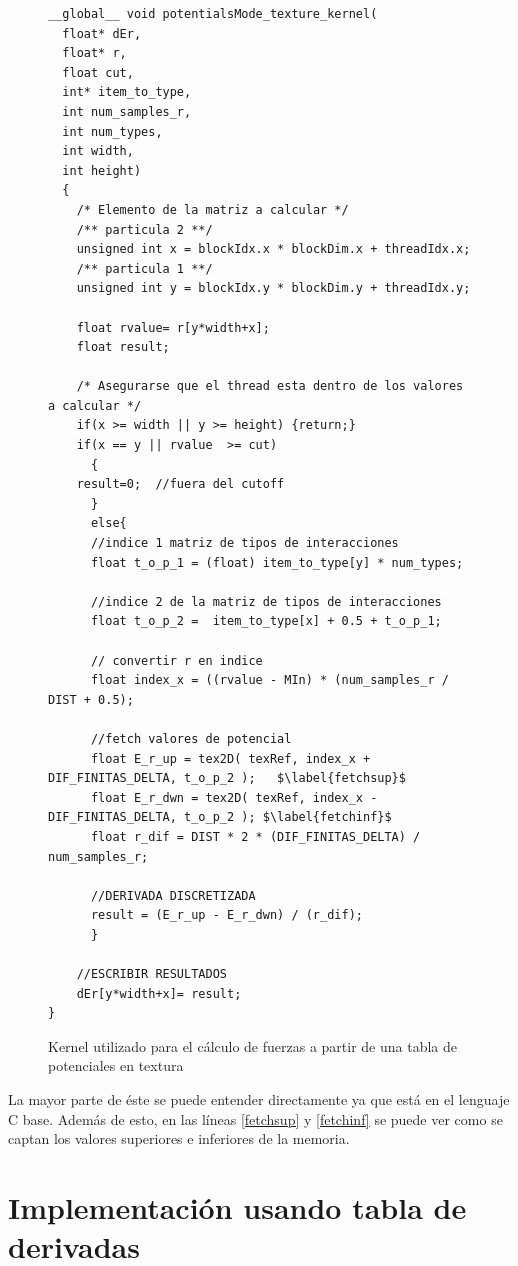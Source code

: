 \begin{figure}[htbp]
    \begin{lstlisting}
__global__ void potentialsMode_texture_kernel(
  float* dEr,
  float* r, 
  float cut, 
  int* item_to_type, 
  int num_samples_r, 
  int num_types, 
  int width, 
  int height)
  {
    /* Elemento de la matriz a calcular */
    /** particula 2 **/
    unsigned int x = blockIdx.x * blockDim.x + threadIdx.x;	
    /** particula 1 **/
    unsigned int y = blockIdx.y * blockDim.y + threadIdx.y;
    
    float rvalue= r[y*width+x]; 
    float result;
    
    /* Asegurarse que el thread esta dentro de los valores a calcular */
    if(x >= width || y >= height) {return;}
    if(x == y || rvalue  >= cut) 
      {
	result=0;  //fuera del cutoff
      }
      else{
      //indice 1 matriz de tipos de interacciones
      float t_o_p_1 = (float) item_to_type[y] * num_types;	
      
      //indice 2 de la matriz de tipos de interacciones
      float t_o_p_2 =  item_to_type[x] + 0.5 + t_o_p_1;	
      
      // convertir r en indice
      float index_x = ((rvalue - MIn) * (num_samples_r / DIST + 0.5);	
      
      //fetch valores de potencial
      float E_r_up = tex2D( texRef, index_x + DIF_FINITAS_DELTA, t_o_p_2 );   $\label{fetchsup}$
      float E_r_dwn = tex2D( texRef, index_x - DIF_FINITAS_DELTA, t_o_p_2 ); $\label{fetchinf}$
      float r_dif = DIST * 2 * (DIF_FINITAS_DELTA) / num_samples_r;
      
      //DERIVADA DISCRETIZADA
      result = (E_r_up - E_r_dwn) / (r_dif); 
      }
   
    //ESCRIBIR RESULTADOS
    dEr[y*width+x]= result;
}
    \end{lstlisting}
    \caption{Kernel utilizado para el cálculo de fuerzas a partir de una tabla de potenciales en textura}
    \label{code:potentialsKernel}
\end{figure}

La mayor parte de éste se puede entender directamente ya que está en el lenguaje C base. Además de esto, en las líneas \ref{fetchsup} y \ref{fetchinf} se puede ver como se captan los valores superiores e inferiores de la memoria.



\section{Implementación usando tabla de derivadas}

